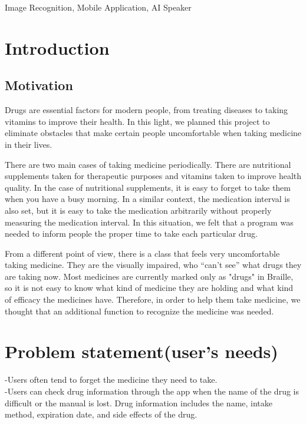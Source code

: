 \documentclass[conference]{IEEEtran}
\begin{document}
\begin{IEEEkeywords}
Image Recognition, Mobile Application, AI Speaker
\end{IEEEkeywords}

\section{Introduction}
\subsection{Motivation}
Drugs are essential factors for modern people, from treating diseases to taking vitamins to improve their health. In this light, we planned this project to eliminate obstacles that make certain people uncomfortable when taking medicine in their lives.

There are two main cases of taking medicine periodically. There are nutritional supplements taken for therapeutic purposes and vitamins taken to improve health quality. In the case of nutritional supplements, it is easy to forget to take them when you have a busy morning. In a similar context, the medication interval is also set, but it is easy to take the medication arbitrarily without properly measuring the medication interval. In this situation, we felt that a program was needed to inform people the proper time to take each particular drug.

From a different point of view, there is a class that feels very uncomfortable taking medicine. They are the visually impaired, who “can’t see” what drugs they are taking now. Most medicines are currently marked only as "drugs" in Braille, so it is not easy to know what kind of medicine they are holding and what kind of efficacy the medicines have. Therefore, in order to help them take medicine, we thought that an additional function to recognize the medicine was needed.\\

\section{Problem statement(user's needs)}
-Users often tend to forget the medicine they need to take.\\

-Users can check drug information through the app when the name of the drug is difficult or the manual is lost. Drug information includes the name, intake method, expiration date, and side effects of the drug.\\
\end{document}

